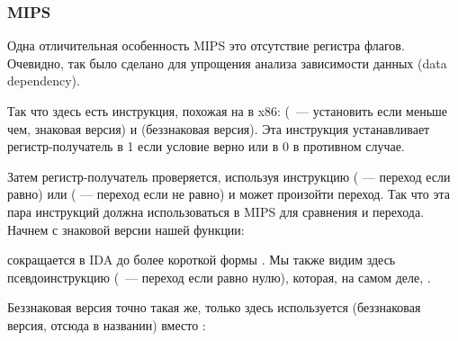 ﻿\subsubsection{MIPS}

Одна отличительная особенность MIPS это отсутствие регистра флагов.
Очевидно, так было сделано для упрощения анализа зависимости данных (data dependency).

Так что здесь есть инструкция, похожая на  в x86:  (~--- установить если
меньше чем, знаковая версия) и  (беззнаковая версия).
Эта инструкция устанавливает регистр-получатель в 1 если условие верно или в 0 в противном случае.

Затем регистр-получатель проверяется, используя инструкцию 
 ( --- переход если равно) или  ( --- переход если не равно) 
и может произойти переход.
Так что эта пара инструкций должна использоваться в MIPS для сравнения и перехода.
Начнем с знаковой версии нашей функции:



 сокращается в IDA до более короткой формы .
Мы также видим здесь псевдоинструкцию  (~--- переход если равно нулю), 
которая, на самом деле, .

Беззнаковая версия точно такая же, только здесь используется  (беззнаковая версия, 
отсюда  в названии) вместо :




